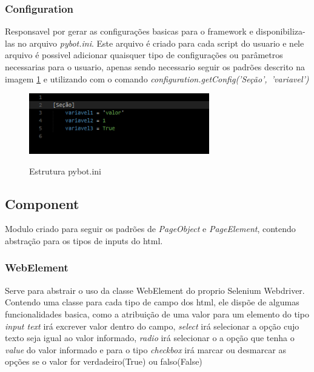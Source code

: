             \subsubsection{Configuration}
            Responsavel por gerar as configurações basicas para o framework e disponibiliza-las no arquivo \emph{pybot.ini}.
            Este arquivo é criado para cada script do usuario e nele arquivo é possivel adicionar quaisquer tipo de configurações ou parâmetros
            necessarias para o usuario, apenas sendo necessario seguir os padrões descrito na imagem \ref{fig:pybot.ini} e utilizando com o comando
            \mbox{\emph{configuration.getConfig('Seção', 'variavel')}}

            \begin{figure}[H]
                \vspace*{0,3cm}
                \centering
                \caption{Estrutura pybot.ini}
                \includegraphics[width=0.7\textwidth]{./04-figuras/ini}
                \label{fig:pybot.ini}
            \end{figure}

        \subsection{Component}
        \label{Comp}
            Modulo criado para seguir os padrões de \emph{PageObject} e \emph{PageElement}, contendo abstração para os tipos de inputs do html.

            \subsubsection{WebElement}
                Serve para abstrair o uso da classe WebElement do proprio Selenium Webdriver. Contendo uma classe para cada tipo de campo dos html,
                ele dispõe de algumas funcionalidades basica, como a atribuição de uma valor para um elemento do tipo \emph{input text} irá excrever
                valor dentro do campo, \emph{select} irá selecionar a opção cujo texto seja igual ao valor informado, \emph{radio} irá selecionar o
                a opção que tenha o \emph{value} do valor informado e para o tipo \emph{checkbox} irá marcar ou desmarcar as opções se o valor for
                verdadeiro(True) ou falso(False)

